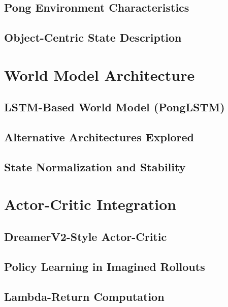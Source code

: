 \documentclass[
	english,
	ruledheaders=section,
	class=report,
	thesis={type=master},
	accentcolor=9c,
	custommargins=true,
	marginpar=false,
	parskip=half-,
	fontsize=11pt,
]{tudapub}
\begin{document}
\subsection{Pong Environment Characteristics}
\label{subsec:pong_characteristics}

\subsection{Object-Centric State Description}
\label{subsec:state_description}

\section{World Model Architecture}
\label{sec:world_model_arch}

\subsection{LSTM-Based World Model (PongLSTM)}
\label{subsec:ponglstm}

\subsection{Alternative Architectures Explored}
\label{subsec:alternative_architectures}

\subsection{State Normalization and Stability}
\label{subsec:normalization}

\section{Actor-Critic Integration}
\label{sec:actor_critic}

\subsection{DreamerV2-Style Actor-Critic}
\label{subsec:dreamer_ac}

\subsection{Policy Learning in Imagined Rollouts}
\label{subsec:imagined_rollouts}

\subsection{Lambda-Return Computation}
\label{subsec:lambda_returns}
\end{document}
